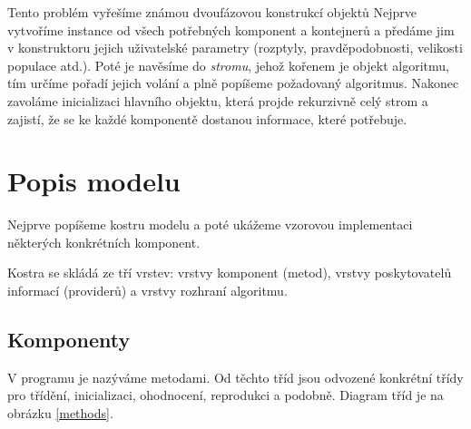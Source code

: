 Tento problém vyřešíme známou dvoufázovou konstrukcí objektů Nejprve vytvoříme instance od všech potřebných komponent a kontejnerů a předáme jim v konstruktoru jejich uživatelské parametry (rozptyly, pravděpodobnosti, velikosti populace atd.). Poté je navěsíme do \emph{stromu}, jehož kořenem je objekt algoritmu, tím určíme pořadí jejich volání a plně popíšeme požadovaný algoritmus. Nakonec zavoláme inicializaci hlavního objektu, která projde rekurzivně celý strom a zajistí, že se ke každé komponentě dostanou informace, které potřebuje.

\section{Popis modelu} 

Nejprve popíšeme kostru modelu a poté ukážeme vzorovou implementaci některých konkrétních komponent.

Kostra se skládá ze tří vrstev: vrstvy komponent (metod), vrstvy poskytovatelů informací (providerů) a vrstvy rozhraní algoritmu. 

\subsection{Komponenty}

V programu je nazýváme metodami. Od těchto tříd jsou odvozené konkrétní třídy pro třídění, inicializaci, ohodnocení, reprodukci a podobně. Diagram tříd je na obrázku \ref{methods}.

